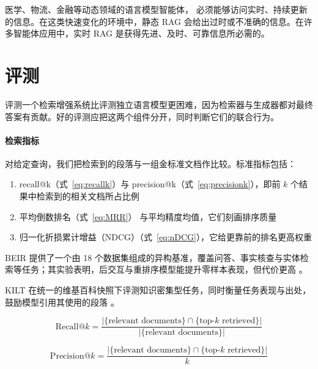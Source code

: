 医学、物流、金融等动态领域的语言模型智能体，%
必须能够访问实时、持续更新的信息。在这类快速变化的环境中，静态 RAG 会给出过时或不准确的信息。在许多智能体应用中，实时 RAG 是获得先进、及时、可靠信息所必需的。


\section{评测}\label{sec:r_evaluation}
评测一个检索增强系统比评测独立语言模型更困难，因为检索器与生成器都对最终答案有贡献。好的评测应把这两个组件分开，同时判断它们的联合行为。

\paragraph{检索指标}  对给定查询，我们把检索到的段落与一组金标准文档作比较。标准指标包括：
\begin{enumerate}
    \item recall@k（式~\ref{eq:recallk}）与 precision@k（式~\ref{eq:precisionk}），即前 $k$ 个结果中检索到的相关文档所占比例
    \item 平均倒数排名（式~\ref{eq:MRR}）
    与平均精度均值，它们刻画排序质量
    \item 归一化折损累计增益（NDCG）（式~\ref{eq:nDCG}），它给更靠前的排名更高权重
\end{enumerate}
BEIR 提供了一个由 18 个数据集组成的异构基准，覆盖问答、事实核查与实体检索等任务；其实验表明，后交互与重排序模型能提升零样本表现，但代价更高 \citep{thakur2021beir}。  

KILT 在统一的维基百科快照下评测知识密集型任务，同时衡量任务表现与出处，鼓励模型引用其使用的段落 \citep{petroni2021kilt}。


\begin{equation}
\mathrm{Recall@}k = \frac{| \{ \text{relevant documents} \} \cap \{ \text{top-}k \text{ retrieved} \} |}{| \{ \text{relevant documents} \} |}
\label{eq:recallk}
\end{equation}

\begin{equation}
\mathrm{Precision@}k = \frac{| \{ \text{relevant documents} \} \cap \{ \text{top-}k \text{ retrieved} \} |}{k}
\label{eq:precisionk}
\end{equation}

